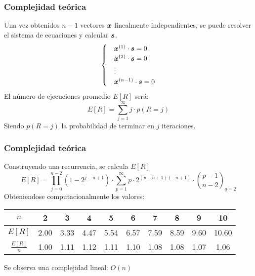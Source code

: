 \begin{frame}
\frametitle{Complejidad teórica}
Una vez obtenidos $n-1$ vectores $\boldsymbol{x}$ linealmente independientes, se puede 
resolver el sistema de ecuaciones y calcular $\boldsymbol{s}$.
\begin{equation*}
\begin{cases}
	& \boldsymbol{x}^{(1)} \cdot \boldsymbol{s} = 0 \\
	& \boldsymbol{x}^{(2)} \cdot \boldsymbol{s} = 0 \\
	& \vdots \\
	& \boldsymbol{x}^{(n-1)} \cdot \boldsymbol{s} = 0 \\
\end{cases}
\end{equation*}
El número de ejecuciones promedio $E[R]$ será:
$$ E[R] = \sum^{\infty}_{j=1} j \cdot p(R=j) $$
Siendo $p(R=j)$ la probabilidad de terminar en $j$ iteraciones.

\end{frame}
\begin{frame}
\frametitle{Complejidad teórica}

Construyendo una recurrencia, se calcula $E[R]$
$$ E[R] = \prod^{n-2}_{j=0} (1 - 2^{j-n+1}) \cdot \sum_{p=1}^\infty p \cdot 
2^{(p-n+1)(-n+1)} \cdot {p-1 \choose n-2}_{q=2} $$
Obteniendose computacionalmente los valores:
\begin{center}
	\small
	\begin{tabular}{c*{9}{c}}
		\toprule
		$n$      & 2 & 3 & 4 & 5 & 6 & 7 & 8 & 9 & 10\\
		\midrule
		$E[R]$   &
2.00& 3.33& 4.47& 5.54& 6.57& 7.59& 8.59& 9.60& 10.60
\\
		$\frac{E[R]}{n}$ &
1.00& 1.11& 1.12& 1.11& 1.10& 1.08& 1.08& 1.07& 1.06\\
		\bottomrule
	\end{tabular}
\end{center}

Se observa una complejidad lineal: $O(n)$

\end{frame}
